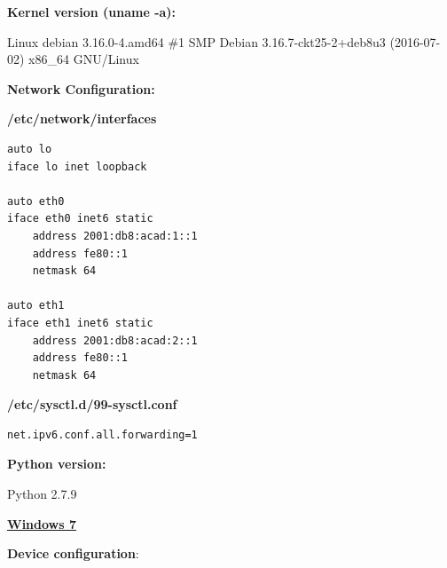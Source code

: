 \documentclass[12pt]{article}
\begin{document}
\textbf{Kernel version (uname -a):} 

\vspace{-15pt}
Linux debian 3.16.0-4.amd64 \#1 SMP Debian 3.16.7-ckt25-2+deb8u3 (2016-07-02) x86_64 GNU/Linux

\textbf{Network Configuration:}

\vspace{-10pt}
\textbf{/etc/network/interfaces}
\vspace{-5pt}
\begin{lstlisting}[style=python,basicstyle=\ttfamily\scriptsize]
auto lo
iface lo inet loopback

auto eth0
iface eth0 inet6 static
	address 2001:db8:acad:1::1
	address fe80::1
	netmask 64

auto eth1
iface eth1 inet6 static
	address 2001:db8:acad:2::1
	address fe80::1
	netmask 64
\end{lstlisting}

\vspace{-10pt}
\textbf{/etc/sysctl.d/99-sysctl.conf}

\vspace{-5pt}
\begin{lstlisting}[style=python,basicstyle=\ttfamily\scriptsize]
 net.ipv6.conf.all.forwarding=1
\end{lstlisting}

\vspace{-10pt}
\textbf{Python version:} 

\vspace{-15pt}
Python 2.7.9

\textbf{\underline{Windows 7}}

\vspace{-10pt}
\textbf{Device configuration}:

\begin{savenotes}
\begin{table}[!htpb]
\centering
\addtolength{\tabcolsep}{1pt}
\noindent{}
\caption{Windows 7}
\label{table:windows7}
\end{table}
\end{savenotes}
\end{document}
